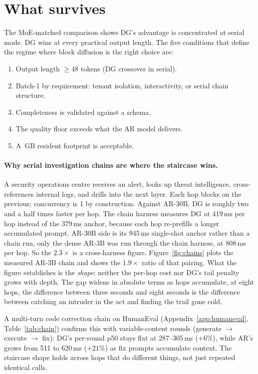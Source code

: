 \section{What survives}
\label{sec:survives}

The MoE-matched comparison shows DG's advantage is concentrated at
serial mode. DG wins at every practical output length. The five
conditions that define the regime where block diffusion is the right
choice are:
\begin{enumerate}[nosep]
  \item Output length $\geq 48$ tokens (DG crossover in serial).
  \item Batch-1 by requirement: tenant isolation, interactivity, or
    serial chain structure.
  \item Completeness is validated against a schema.
  \item The quality floor exceeds what the AR model delivers.
  \item A \dgWeights\,GB resident footprint is acceptable.
\end{enumerate}

\paragraph{Why serial investigation chains are where the staircase wins.}

A security operations centre receives an alert, looks up threat
intelligence, cross-references internal logs, and drills into the next
layer. Each hop blocks on the previous; concurrency is 1 by
construction. Against AR-30B, DG is roughly two and a half times faster per
hop. The chain harness measures DG at 419\,ms per hop instead of the
379\,ms anchor, because each hop re-prefills a longer accumulated
prompt. AR-30B side is its 945\,ms single-shot anchor rather
than a chain run, only the dense AR-3B was run through the chain
harness, at 808\,ms per hop. So the $2.3\times$ is a cross-harness
figure. Figure~\ref{fig:chains} plots the measured AR-3B chain and
shows the $1.9\times$ ratio of that pairing. What the figure
establishes is the \emph{shape}: neither the per-hop cost nor DG's tail
penalty grows with depth. The gap widens in absolute terms as hops
accumulate, at eight hops, the difference between three seconds and
eight seconds is the difference between catching an intruder in
the act and finding the trail gone cold.

A multi-turn code correction chain on HumanEval
(Appendix~\ref{app:humaneval}, Table~\ref{tab:chain}) confirms this
with variable-content rounds (generate $\to$ execute $\to$ fix):
DG's per-round p50 stays flat at 287--305\,ms ($+6\%$), while AR's
grows from 511 to 620\,ms ($+21\%$) as fix prompts accumulate
context. The staircase shape holds across hops that do different
things, not just repeated identical calls.

